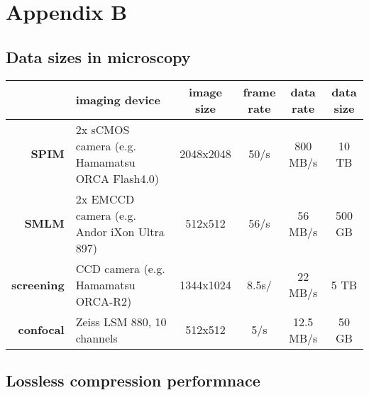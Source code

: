 \chapter*{Appendix B}

\setcounter{table}{0}
\renewcommand{\thetable}{B\arabic{table}}

\section*{Data sizes in microscopy}

\begin{table}[tbp]
  \begin{small}
    \renewcommand{\arraystretch}{2}
    \centering
    \begin{tabular}{rp{5cm}cccc}
        & \textbf{imaging device} & \textbf{image size} &  \parbox[c]{1.2cm}{\textbf{frame}\\ \textbf{rate}} & \textbf{data rate} & \parbox[c]{1.2cm}{\textbf{data\\ size}} \\
        \hline
        \hline
        \textbf{SPIM} & 2x sCMOS camera (e.g. Hamamatsu ORCA Flash4.0) & 2048x2048 & 50/s & 800 MB/s & 10 TB \\ \hline
        \textbf{SMLM} & 2x EMCCD camera (e.g. Andor iXon Ultra 897) & 512x512 & 56/s & 56 MB/s & 500 GB \\ \hline
        \textbf{screening} & CCD camera (e.g. Hamamatsu ORCA-R2) & 1344x1024 & 8.5s/ & 22 MB/s & 5 TB \\ \hline
        \textbf{confocal} & Zeiss LSM 880, 10 channels & 512x512 & 5/s & 12.5 MB/s & 50 GB \\ 
    \end{tabular}
    \label{tab:sizes}
  \end{small}
\end{table}


  
\section*{Lossless compression performnace}

